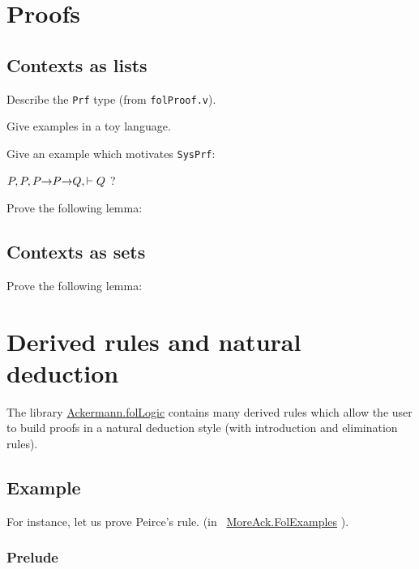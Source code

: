 \section{Proofs}

\subsection{Contexts as lists}
\begin{todo}
Describe the \texttt{Prf} type (from \texttt{folProof.v}).

Give examples in a toy language.

Give an example which motivates \texttt{SysPrf}:

$P,P , P\mbox{$\rightarrow$} P \mbox{$\rightarrow$} Q, \vdash Q$ ?
\end{todo}

\begin{exercise}

Prove the following lemma:

\end{exercise}

\subsection{Contexts as sets}

\begin{exercise}

Prove the following lemma:

\end{exercise}


\section{Derived rules and natural deduction}


 The library 
 \href{../theories/html/hydras.Ackermann.folLogic.html}{Ackermann.folLogic} contains many derived rules which allow the user to build proofs in a natural deduction style (with introduction and elimination rules).

\subsection{Example}

For instance, let us prove Peirce's rule.
 (in  ~\href{../theories/html/hydras.MoreAck.FolExamples.html}{MoreAck.FolExamples} ).

\subsubsection{Prelude}

